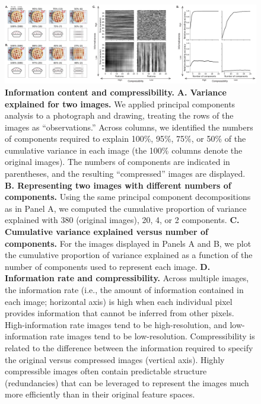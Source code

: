 \documentclass[english, 11pt]{article}
\begin{document}
\begin{figure}[tp]

  \centering
  \includegraphics[width=\textwidth]{figs/information_and_compressibility}
  
  \caption{\textbf{Information content and compressibility.} \textbf{A.
  Variance explained for two images.} We applied principal components analysis
  to a photograph and drawing, treating the rows of the images as
  ``observations.'' Across columns, we identified the numbers of components
  required to explain 100\%, 95\%, 75\%, or 50\% of the cumulative variance in
  each image (the 100\% columns denote the original images). The numbers of
  components are indicated in parentheses, and the resulting ``compressed''
  images are displayed. \textbf{B. Representing two images with different
  numbers of components.} Using the same principal component decompositions as
  in Panel A, we computed the cumulative proportion of variance explained with
  380 (original images), 20, 4, or 2 components. \textbf{C. Cumulative variance
  explained versus number of components.} For the images displayed in Panels A
  and B, we plot the cumulative proportion of variance explained as a function
  of the number of components used to represent each image. \textbf{D.
  Information rate and compressibility.} Across multiple images, the
  information rate (i.e., the amount of information contained in each image;
  horizontal axis) is high when each individual pixel provides information that
  cannot be inferred from other pixels. High-information rate images tend to be
  high-resolution, and low-information rate images tend to be low-resolution.
  Compressibility is related to the difference between the information required
  to specify the original versus compressed images (vertical axis). Highly
  compressible images often contain predictable structure (redundancies) that
  can be leveraged to represent the images much more efficiently than in their
  original feature spaces.}

\label{fig:information-compression} 
\end{figure}
\end{document}
